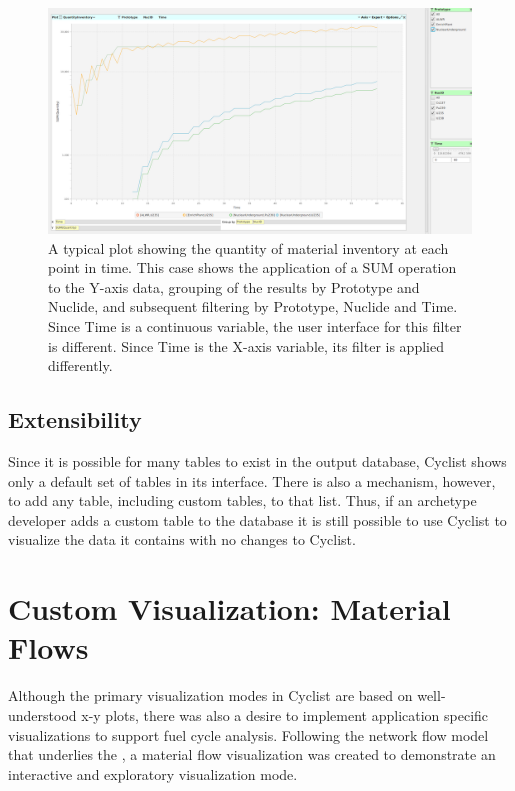 \begin{figure}[htbp]
  \centering
  \includegraphics[width=\columnwidth]{./images/plot-01-07}
  \caption[Material invetory plot from Cyclist showing aggregation and
    filtering.]{A typical plot showing the quantity of material inventory at
    each point in time.  This case shows the application of a SUM operation to
    the Y-axis data, grouping of the results by Prototype and Nuclide, and
    subsequent filtering by Prototype, Nuclide and Time.  Since Time is a
    continuous variable, the user interface for this filter is different.
    Since Time is the X-axis variable, its filter is applied differently.  }
  \label{fig:plot-01-07}
\end{figure}

\subsection{Extensibility}

Since it is possible for many tables to exist in the \Cyclus output database,
Cyclist shows only a default set of tables in its interface.  There is also a
mechanism, however, to add any table, including custom tables, to that list.
Thus, if an archetype developer adds a custom table to the database it is
still possible to use Cyclist to visualize the data it contains with no
changes to Cyclist.

\section{Custom Visualization: Material Flows}

Although the primary visualization modes in Cyclist are based on
well-understood x-y plots, there was also a desire to implement application
specific visualizations to support fuel cycle analysis.  Following the network
flow model that underlies the \Cyclus, a material flow visualization was
created to demonstrate an interactive and exploratory visualization mode.

